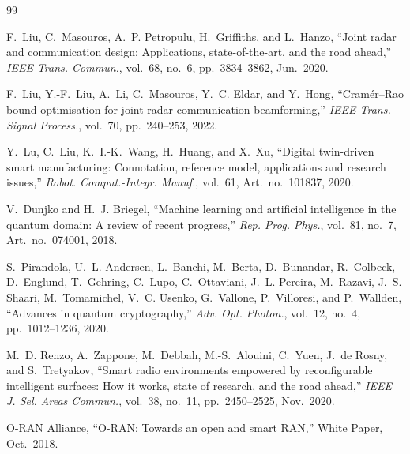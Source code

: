 \documentclass[10pt,journal]{IEEEtran}
\begin{document}
\begin{thebibliography}{99}

F.~Liu, C.~Masouros, A.~P. Petropulu, H.~Griffiths, and L.~Hanzo,
``Joint radar and communication design: Applications, state-of-the-art, and the road ahead,''
\emph{IEEE Trans. Commun.}, vol.~68, no.~6, pp.~3834--3862, Jun.~2020.

F.~Liu, Y.-F.~Liu, A.~Li, C.~Masouros, Y.~C. Eldar, and Y.~Hong,
``Cram\'er--Rao bound optimisation for joint radar-communication beamforming,''
\emph{IEEE Trans. Signal Process.}, vol.~70, pp.~240--253, 2022.

Y.~Lu, C.~Liu, K.~I.-K.~Wang, H.~Huang, and X.~Xu,
``Digital twin-driven smart manufacturing: Connotation, reference model, applications and research issues,''
\emph{Robot. Comput.-Integr. Manuf.}, vol.~61, Art.~no.~101837, 2020.

V.~Dunjko and H.~J. Briegel,
``Machine learning and artificial intelligence in the quantum domain: A review of recent progress,''
\emph{Rep. Prog. Phys.}, vol.~81, no.~7, Art.~no.~074001, 2018.

S.~Pirandola, U.~L. Andersen, L.~Banchi, M.~Berta, D.~Bunandar, R.~Colbeck, D.~Englund, T.~Gehring, C.~Lupo, C.~Ottaviani, J.~L. Pereira, M.~Razavi, J.~S. Shaari, M.~Tomamichel, V.~C. Usenko, G.~Vallone, P.~Villoresi, and P.~Wallden,
``Advances in quantum cryptography,''
\emph{Adv. Opt. Photon.}, vol.~12, no.~4, pp.~1012--1236, 2020.

M.~D. Renzo, A.~Zappone, M.~Debbah, M.-S.~Alouini, C.~Yuen, J.~de Rosny, and S.~Tretyakov,
``Smart radio environments empowered by reconfigurable intelligent surfaces: How it works, state of research, and the road ahead,''
\emph{IEEE J. Sel. Areas Commun.}, vol.~38, no.~11, pp.~2450--2525, Nov.~2020.

O-RAN Alliance,
``O-RAN: Towards an open and smart RAN,''
White Paper, Oct.~2018.

\end{thebibliography}

\balance
\end{document}
